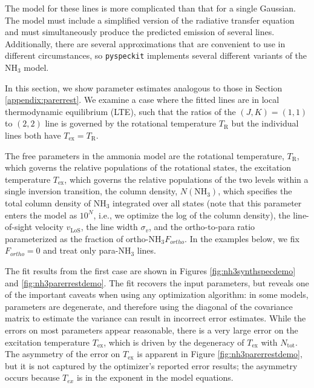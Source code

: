 \documentclass[twocolumn]{aastex63}
\newcommand{\pyspeckit}{\texttt{pyspeckit}\xspace}
\newcommand{\ammonia}{\ensuremath{\mathrm{NH}_3}\xspace}
\begin{document}
The model for these lines is more complicated than that for a single Gaussian.
The model must include a simplified version of the radiative transfer equation
and must simultaneously produce the predicted emission of several lines.
Additionally, there are several approximations that are convenient to use
in different circumstances, so \pyspeckit implements several different
variants of the \ammonia model.

In this section, we show parameter estimates analogous to those in Section
\ref{appendix:parerrest}.
We examine a case where the fitted lines are in local
thermodynamic equilibrium (LTE), such that the ratios of the $(J,K)=(1,1)$
to $(2,2)$ line is governed by the rotational temperature $T_\mathrm{R}$ but
the individual lines both have $T_{\mathrm{ex}}=T_{\mathrm{R}}$.

The free parameters in the ammonia model are the rotational temperature,
$T_{\mathrm{R}}$, which governs the relative populations of the rotational
states, the excitation temperature $T_{\mathrm{ex}}$, which governs the
relative populations of the two levels within a single inversion transition,
the column density, $N(\ammonia)$, which specifies the total column density of
\ammonia integrated over all states (note that this parameter enters the model
as $10^N$, i.e., we optimize the log of the column density), the line-of-sight
velocity $v_\mathrm{LoS}$, the line width $\sigma_v$, and the ortho-to-para
ratio parameterized as the fraction of ortho-\ammonia $F_{ortho}$.  In the
examples below, we fix $F_{ortho}=0$ and treat only para-\ammonia lines.


The fit results from the first case are shown in Figures
\ref{fig:nh3synthspecdemo} and \ref{fig:nh3parerrestdemo}.  The fit recovers
the input parameters, but reveals one of the important caveats when using any
optimization algorithm: in some models, parameters are degenerate, and
therefore using the diagonal of the covariance matrix to estimate the variance
can result in incorrect error estimates.  While the errors on most parameters
appear reasonable, there is a very large error on the excitation temperature
$T_{\mathrm{ex}}$, which is driven by the degeneracy of $T_{\mathrm{ex}}$ with
$N_\mathrm{tot}$.  The asymmetry of the error on $T_{\mathrm{ex}}$ is apparent
in Figure \ref{fig:nh3parerrestdemo}, but it is not captured by the optimizer's
reported error results; the asymmetry occurs because $T_{ex}$ is in the
exponent in the model equations.
\end{document}
